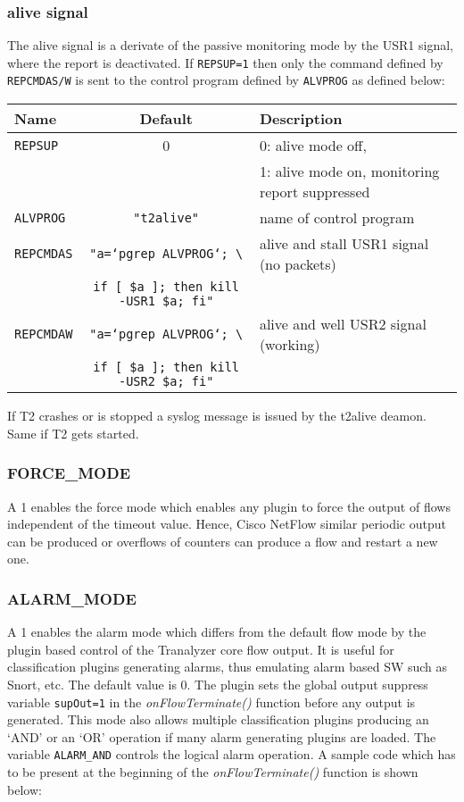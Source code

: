 \subsubsection{alive signal}
The alive signal is a derivate of the passive monitoring mode by the USR1 signal, where the
report is deactivated. If {\tt REPSUP=1} then only the command defined by {\tt REPCMDAS/W} is sent to the
control program defined by {\tt ALVPROG} as defined below:

\begin{longtable}{lcl}
    \toprule
    {\bf Name} & {\bf Default} & {\bf Description}\\
    \midrule\endhead%
    {\tt REPSUP}   & 0 & 0: alive mode off,\\
                   &   & 1: alive mode on, monitoring report suppressed \\
    {\tt ALVPROG}  & {\tt "t2alive"} & name of control program \\
    {\tt REPCMDAS} & {\tt "a=`pgrep ALVPROG`; \textbackslash} & alive and stall USR1 signal (no packets) \\
                   & {\tt if [ \$a ]; then kill -USR1 \$a; fi"} \\
    {\tt REPCMDAW} & {\tt "a=`pgrep ALVPROG`; \textbackslash} & alive and well USR2 signal (working) \\
                   & {\tt if [ \$a ]; then kill -USR2 \$a; fi"} \\
    \bottomrule
\end{longtable}

If T2 crashes or is stopped a syslog message is issued by the t2alive deamon. Same if T2 gets started.

\subsubsection{FORCE\_MODE}
A 1 enables the force mode which enables any plugin to force the output of flows independent of the timeout value. Hence, Cisco NetFlow
similar periodic output can be produced or overflows of counters can produce a flow and restart a new one.

\subsubsection{ALARM\_MODE}
A 1 enables the alarm mode which differs from the default flow mode by the plugin based control of the Tranalyzer core flow output. It is useful for
classification plugins generating alarms, thus emulating alarm based SW such as Snort, etc. The default value is 0.
The plugin sets the global output suppress variable {\tt supOut=1} in the {\em onFlowTerminate()} function before any output is generated. This mode also allows multiple classification plugins producing an `AND' or an `OR' operation if many alarm generating plugins are loaded. The variable {\tt ALARM\_AND} controls the logical alarm operation. A sample code which has to be present at the beginning of the {\em onFlowTerminate()} function is shown below:


